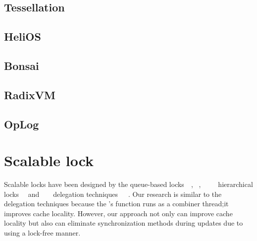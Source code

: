 \subsection{Tessellation}
\subsection{HeliOS}


\subsection{Bonsai}
\subsection{RadixVM}
\subsection{OpLog}

\section{Scalable lock}
\label{sec:lockrelated}
Scalable locks have been designed by the
queue-based locks~\cite{MellorCrummey1991MCS}~\cite{Magnusson1994QLC},
~\cite{Wang2016BeMyGuest},
~\cite{Scott2013SS}
~\cite{Bueso2014MCS}~\cite{Bueso2015STP}
hierarchical locks~\cite{Radovic2003HBL}~\cite{Chabbi2016CLL} and
~\cite{Luchangco2006HCQ}
~\cite{Chabbi2015HPL}
delegation techniques~\cite{Hendler2010FC}~\cite{Fatourou2012RCS}~\cite{Delegation2014}.
Our research is similar to the delegation techniques because
the \LDU's  function runs as a
combiner thread;it improves cache locality.
However, our approach not only can improve cache locality but also
can eliminate synchronization methods during updates due to using a lock-free manner.

